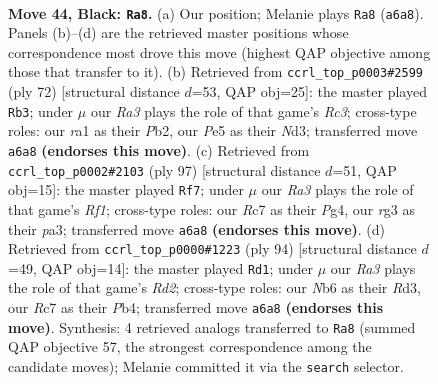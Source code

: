 \documentclass[11pt]{article}
\begin{document}
\clearpage

\begin{figure}[p]\centering
\begin{subfigure}{0.46\textwidth}\centering
\resizebox{\linewidth}{!}{%
\newchessgame
\chessboard[
  setfen={5k2/2r2p1p/rn4p1/p3p1P1/P3P3/NP4RP/3K2P1/R7 b - - 3 44},
  showmover=false,
  pgfstyle=straightmove, color=movearrow, markmove={a6-a8}
]}
\caption{}
\end{subfigure}\hfill
\begin{subfigure}{0.46\textwidth}\centering
\resizebox{\linewidth}{!}{%
\newchessgame
\chessboard[
  setfen={r7/r2n1pk1/2R1p2p/p5p1/P3P3/2RNK2P/1P4P1/8 w - - 2 37},
  showmover=false,
  pgfstyle=straightmove, color=movearrow, markmove={c3-b3}
]}
\caption{}
\end{subfigure}
\\[4pt]
\begin{subfigure}{0.46\textwidth}\centering
\resizebox{\linewidth}{!}{%
\newchessgame
\chessboard[
  setfen={5rk1/1p6/2p5/2Pp1p2/p2P1Pp1/P3R1P1/1P1K2R1/5r2 b - - 0 49},
  showmover=false,
  pgfstyle=straightmove, color=movearrow, markmove={f8-f7}
]}
\caption{}
\end{subfigure}\hfill
\begin{subfigure}{0.46\textwidth}\centering
\resizebox{\linewidth}{!}{%
\newchessgame
\chessboard[
  setfen={r3r1k1/6p1/1pP2p1p/1P2pP1P/1P1p4/3R4/3R1P2/6K1 w - - 1 48},
  showmover=false,
  pgfstyle=straightmove, color=movearrow, markmove={d2-d1}
]}
\caption{}
\end{subfigure}
\caption{\textbf{Move 44, Black: \texttt{Ra8}.} (a) Our position; Melanie plays \texttt{Ra8} (\texttt{a6a8}). Panels (b)--(d) are the retrieved master positions whose correspondence most drove this move (highest QAP objective among those that transfer to it). (b) Retrieved from \texttt{ccrl\_top\_p0003\#2599} (ply 72) [structural distance $d$=53, QAP obj=25]: the master played \texttt{Rb3}; under $\mu$ our \emph{Ra3} plays the role of that game's \emph{Rc3}; cross-type roles: our \emph{r}a1 as their \emph{P}b2, our \emph{P}e5 as their \emph{N}d3; transferred move \texttt{a6a8} \textbf{(endorses this move)}. (c) Retrieved from \texttt{ccrl\_top\_p0002\#2103} (ply 97) [structural distance $d$=51, QAP obj=15]: the master played \texttt{Rf7}; under $\mu$ our \emph{Ra3} plays the role of that game's \emph{Rf1}; cross-type roles: our \emph{R}c7 as their \emph{P}g4, our \emph{r}g3 as their \emph{p}a3; transferred move \texttt{a6a8} \textbf{(endorses this move)}. (d) Retrieved from \texttt{ccrl\_top\_p0000\#1223} (ply 94) [structural distance $d$=49, QAP obj=14]: the master played \texttt{Rd1}; under $\mu$ our \emph{Ra3} plays the role of that game's \emph{Rd2}; cross-type roles: our \emph{N}b6 as their \emph{R}d3, our \emph{R}c7 as their \emph{P}b4; transferred move \texttt{a6a8} \textbf{(endorses this move)}. Synthesis: 4 retrieved analogs transferred to \texttt{Ra8} (summed QAP objective 57, the strongest correspondence among the candidate moves); Melanie committed it via the \texttt{search} selector.}
\label{fig:thought-m87}
\end{figure}
\end{document}
